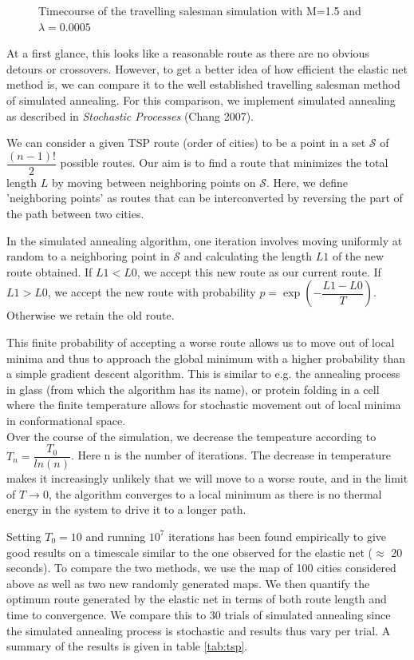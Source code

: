 \documentclass{article}
\begin{document}
\begin{figure}[h]
\begin{subfigure}[t]{0.24\linewidth}
		\label{fig:sim4}	
	\end{subfigure}%
\caption{Timecourse of the travelling salesman simulation with M=1.5 and $\lambda = 0.0005$}
\label{fig:tspsim}
\end{figure}

At a first glance, this looks like a reasonable route as there are no obvious detours or crossovers. However, to get a better idea of how efficient the elastic net method is, we can compare it to the well established travelling salesman method of simulated annealing. For this comparison, we implement simulated annealing as described in \textit{Stochastic Processes} (Chang 2007).

We can consider a given TSP route (order of cities) to be a point in a set $\mathcal{S}$ of $\dfrac{(n-1)!}{2}$ possible routes. Our aim is to find a route that minimizes the total length $L$ by moving between neighboring points on $\mathcal{S}$. Here, we define 'neighboring points' as routes that can be interconverted by reversing the part of the path between two cities.

In the simulated annealing algorithm, one iteration involves moving uniformly at random to a neighboring point in $\mathcal{S}$ and calculating the length $L1$ of the new route obtained.
If $L1 < L0$, we accept this new route as our current route.
If $L1 > L0$, we accept the new route with probability $p = \exp{(-\dfrac{L1-L0}{T})}$. Otherwise we retain the old route.

This finite probability of accepting a worse route allows us to move out of local minima and thus to approach the global minimum with a higher probability than a simple gradient descent algorithm. This is similar to e.g. the annealing process in glass (from which the algorithm has its name), or protein folding in a cell where the finite temperature allows for stochastic movement out of local minima in conformational space.\\
Over the course of the simulation, we decrease the tempeature according to
$
T_n = \dfrac{T_0}{ln(n)}
$.
Here n is the number of iterations. The decrease in temperature makes it increasingly unlikely that we will move to a worse route, and in the limit of $T \rightarrow 0$, the algorithm converges to a local minimum as there is no thermal energy in the system to drive it to a longer path.

Setting $T_0=10$ and running $10^7$ iterations has been found empirically to give good results on a timescale similar to the one observed for the elastic net ($\approx$ 20 seconds).
To compare the two methods, we use the map of 100 cities considered above as well as two new randomly generated maps. We then quantify the optimum route generated by the elastic net in terms of both route length and time to convergence. We compare this to 30 trials of simulated annealing since the simulated annealing process is stochastic and results thus vary per trial. A summary of the results is given in table \ref{tab:tsp}.
\end{document}
